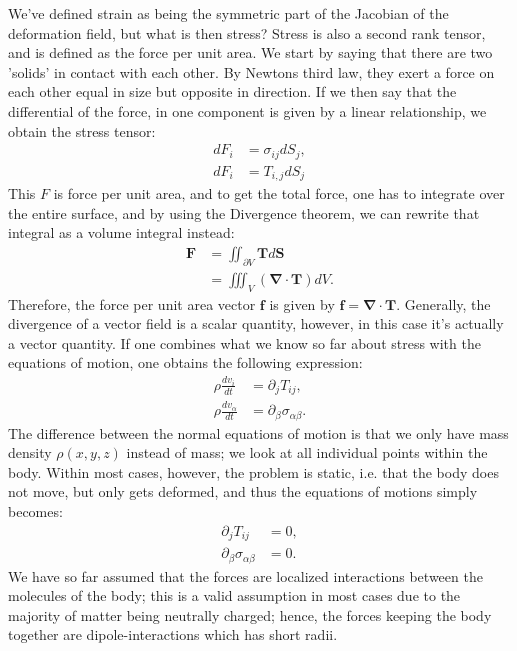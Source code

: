 \documentclass[a4paper]{article}
\newcommand{\dive}[1]{\mathbf{\nabla}\cdot \mathbf{#1}}
\begin{document}
\vspace*{0.5cm}\noindent
We've defined strain as being the symmetric part of the Jacobian of the deformation field, but what is then stress? 
Stress is also a second rank tensor, and is defined as the force per unit area. We start by saying that there are two 'solids' in contact with each other.
By Newtons third law, they exert a force on each other equal in size but opposite in direction. If we then say that the differential of the force, in one component is given by a linear relationship, we obtain the stress tensor:
\begin{align*}
    dF_i &= \sigma_{ij}dS_j,\\
    dF_i &= T_{i,j}dS_j
\end{align*}This $F$ is force per unit area, and to get the total force, one has to integrate over the entire surface, and by using the Divergence theorem, we can rewrite that integral as a volume integral instead:
\begin{align*}
    \mathbf{F} &= \iint_{\partial V}\mathbf{T}d\mathbf{S}\\
    &=\iiint_{V}\left(\dive{T}\right)dV.
\end{align*}Therefore, the force per unit area vector $\mathbf{f}$ is given by $\mathbf{f} = \dive{T}$. Generally, the divergence of a vector field is a scalar quantity, however, in this case it's actually a vector quantity.
If one combines what we know so far about stress with the equations of motion, one obtains the following expression:
\begin{align*}
    \rho\frac{d v_i}{dt} &=\partial_jT_{ij},\\
    \rho\frac{dv_\alpha}{dt} &= \partial_\beta\sigma_{\alpha\beta}.
\end{align*}The difference between the normal equations of motion is that we only have mass density $\rho(x,y,z)$ instead of mass; we look at all individual points within the body.
Within most cases, however, the problem is static, i.e. that the body does not move, but only gets deformed, and thus the equations of motions simply becomes:
\begin{align*}
    \partial_jT_{ij} &= 0,\\
    \partial_\beta\sigma_{\alpha\beta} &= 0.
\end{align*}We have so far assumed that the forces are localized interactions between the molecules of the body; this is a valid assumption in most cases due to the majority of matter being neutrally charged; hence, the forces keeping the body together are dipole-interactions which has short radii.
\end{document}
